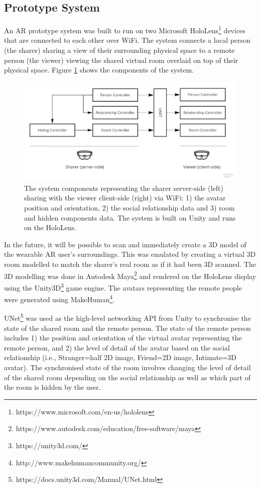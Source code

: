 \subsection{Prototype System}

An AR prototype system was built to run on two Microsoft HoloLens\footnote{https://www.microsoft.com/en-us/hololens} devices that are connected to each other over WiFi. The system connects a local person (the sharer) sharing a view of their surrounding physical space to a remote person (the viewer) viewing the shared virtual room overlaid on top of their physical space. Figure \ref{fig:frontier18:system} shows the components of the system.

\begin{figure}[H]
    \begin{center}
    \includegraphics[width=\linewidth]{images/frontier18/system.jpg}
    \caption{The system components representing the sharer server-side (left) sharing with the viewer client-side (right) via WiFi: 1) the avatar position and orientation, 2) the social relationship data and 3) room and hidden components data. The system is built on Unity and runs on the HoloLens.}\label{fig:frontier18:system}
    \end{center}
\end{figure}

In the future, it will be possible to scan and immediately create a 3D model of the wearable AR user's surroundings. This was emulated by creating a virtual 3D room modelled to match the sharer's real room as if it had been 3D scanned.  The 3D modelling was done in Autodesk Maya\footnote{https://www.autodesk.com/education/free-software/maya} and rendered on the HoloLens display using the Unity3D\footnote{https://unity3d.com/} game engine. The avatars representing the remote people were generated using MakeHuman\footnote{http://www.makehumancommunity.org/}.

UNet\footnote{https://docs.unity3d.com/Manual/UNet.html} was used as the high-level networking API from Unity to synchronise the state of the shared room and the remote person. The state of the remote person includes 1) the position and orientation of the virtual avatar representing the remote person, and 2) the level of detail of the avatar based on the social relationship (i.e., Stranger=half 2D image, Friend=2D image, Intimate=3D avatar). The synchronised state of the room involves changing the level of detail of the shared room depending on the social relationship as well as which part of the room is hidden by the user. 

